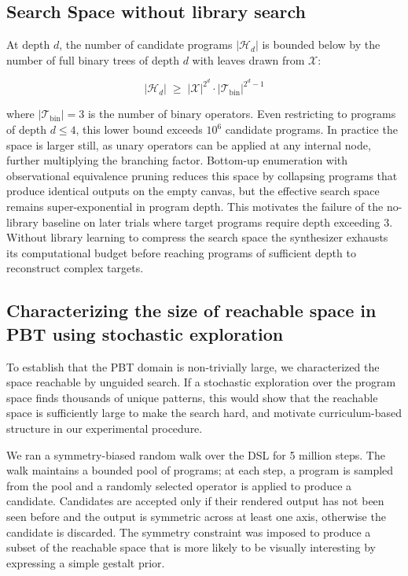 \documentclass{article}
\begin{document}
\subsection{Search Space without library search}

At
depth $d$, the number of candidate programs $|\mathcal{H}_d|$ is bounded below by the number of full binary trees of depth $d$ with leaves drawn from $\mathcal{X}$:

\begin{equation}
    |\mathcal{H}_d| \;\geq\; |\mathcal{X}|^{2^d} \cdot
    |\mathcal{T}_{\mathrm{bin}}|^{2^d - 1}
\end{equation}

\noindent where $|\mathcal{T}_{\mathrm{bin}}| = 3$ is the number of binary operators. Even restricting to programs of depth $d \leq 4$, this lower bound exceeds $10^6$ candidate programs. In practice the space is larger still, as unary operators can be applied at any internal node, further multiplying the branching factor. Bottom-up
enumeration with observational equivalence pruning
\citep{albarghouthi2013recursive, udupa2013transit} reduces this space by collapsing programs that produce identical outputs on the empty canvas, but the effective search space remains super-exponential in program depth. This motivates the failure of the no-library baseline on later trials where target programs require depth exceeding 3. Without library learning to compress the search space the synthesizer exhausts its computational budget before reaching programs of sufficient depth to reconstruct complex targets.


\subsection{Characterizing the size of reachable space in PBT using stochastic exploration}\label{si:randomwalk}

To establish that the PBT domain is non-trivially large, we characterized the space reachable by unguided search. If a stochastic exploration over the program space finds thousands of unique patterns, this would show that the reachable space is sufficiently large to make the search hard, and motivate curriculum-based structure in our experimental procedure. 

We ran a symmetry-biased random walk over the DSL for 5 million steps. The walk maintains a bounded pool of programs; at each step, a program is sampled from the pool and a randomly selected operator is applied to produce a candidate. Candidates are accepted only if their rendered output has not been seen before and the output is symmetric across at least one axis, otherwise the candidate is discarded. The symmetry constraint was imposed to produce a subset of the reachable space that is more likely to be visually interesting by expressing a simple gestalt prior.
\end{document}
